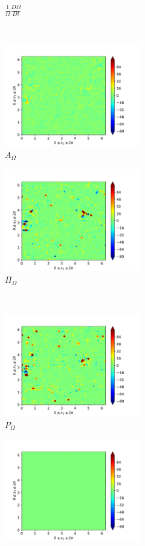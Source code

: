 \begin{figure}[H]
\begin{subfigure}[H]{0.45\textwidth}
        \caption{$\frac{1}{\Omega} \frac{D \Omega}{Dt}$}
    \end{subfigure}
    ~
    \begin{subfigure}{0.45\textwidth}
        \includegraphics[height=1.75in]{media/run-cds-65/A-enst-1460}
        \caption{$A_{\Omega}$}
    \end{subfigure}
    \newline
    \begin{subfigure}{0.45\textwidth}
        \includegraphics[height=1.75in]{media/run-cds-65/Pi-enst-1460}
        \caption{$\Pi_{\Omega}$}
    \end{subfigure}
    ~
    \begin{subfigure}{0.45\textwidth}
        \includegraphics[height=1.75in]{media/run-cds-65/P-enst-1460}
        \caption{$P_{\Omega}$}
    \end{subfigure}
    \newline
    \begin{subfigure}{0.45\textwidth}
        \includegraphics[height=1.75in]{media/run-cds-65/B-enst-1460}

\end{subfigure}
\end{figure}
